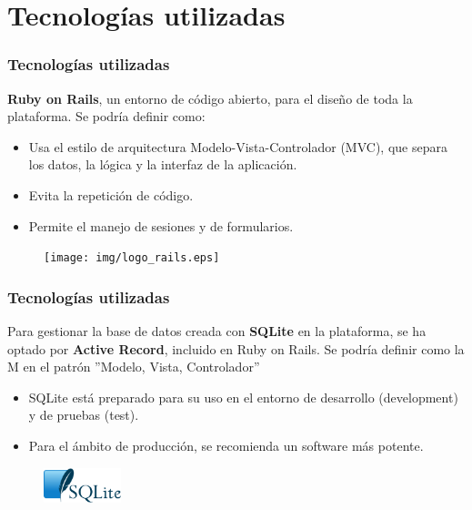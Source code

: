 \documentclass{beamer}
\begin{document}

\section{Tecnologías utilizadas}

\begin{frame}
\frametitle{Tecnologías utilizadas}

\textbf{Ruby on Rails}, un entorno de código abierto, para el diseño de toda la plataforma. Se podría definir como:

\begin{itemize}
    \item Usa el estilo de arquitectura Modelo-Vista-Controlador (MVC), que separa los datos, la lógica y la interfaz de la aplicación.
    \item Evita la repetición de código.
    \item Permite el manejo de sesiones y de formularios.
\end{itemize}

\begin{figure}
    \texttt{[image: img/logo\_rails.eps]}
\end{figure}

\end{frame}

\begin{frame}
\frametitle{Tecnologías utilizadas}

Para gestionar la base de datos creada con \textbf{SQLite} en la plataforma, se ha optado por \textbf{Active Record}, incluido en Ruby on Rails. Se podría definir como la M en el patrón ''Modelo, Vista, Controlador''

\begin{itemize}
    \item SQLite está preparado para su uso en el entorno de desarrollo (development) y de pruebas (test).
    \item Para el ámbito de producción, se recomienda un software más potente.
\end{itemize}

\begin{figure}
    \includegraphics[width=0.2\textwidth]{img/logo_sqlite.eps}
\end{figure}

\end{frame}
\end{document}
